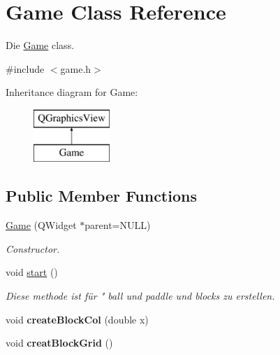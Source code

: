 \hypertarget{class_game}{}\section{Game Class Reference}
\label{class_game}


Die \hyperlink{class_game}{Game} class.  




{\ttfamily \#include $<$game.\+h$>$}

Inheritance diagram for Game\+:\begin{figure}[H]
\begin{center}
\leavevmode
\includegraphics[height=2.000000cm]{class_game}
\end{center}
\end{figure}
\subsection*{Public Member Functions}
\begin{DoxyCompactItemize}
\item 
\hyperlink{class_game_a32d7e09112c37ff84736ea797c1eb7f0}{Game} (Q\+Widget $\ast$parent=N\+U\+LL)
\begin{DoxyCompactList}\small\item\em Constructor. \end{DoxyCompactList}\item 
\mbox{\label{class_game_a3d9b98f7c4a96ecf578f75b96c9f0e90}} 
void \hyperlink{class_game_a3d9b98f7c4a96ecf578f75b96c9f0e90}{start} ()
\begin{DoxyCompactList}\small\item\em Diese methode ist für " ball und paddle und blocks zu erstellen. \end{DoxyCompactList}\item 
\mbox{\label{class_game_ae4d31cfbf571bb1239f9614099614f2f}} 
void {\bfseries create\+Block\+Col} (double x)
\item 
\mbox{\label{class_game_a029fabc7b925001939b1b956ba30df14}} 
void {\bfseries creat\+Block\+Grid} ()
\end{DoxyCompactItemize}
